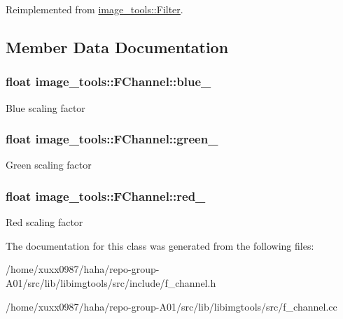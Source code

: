 Reimplemented from \hyperlink{classimage__tools_1_1Filter_afd5d1be5736e343077d331896d4130d9}{image\+\_\+tools\+::\+Filter}.



\subsection{Member Data Documentation}
\subsubsection[{\texorpdfstring{blue\+\_\+}{blue_}}]{\setlength{\rightskip}{0pt plus 5cm}float image\+\_\+tools\+::\+F\+Channel\+::blue\+\_\+\hspace{0.3cm}{\ttfamily [private]}}\hypertarget{classimage__tools_1_1FChannel_a3eb08bcf47005e1672b4516b0c75d7a9}{}\label{classimage__tools_1_1FChannel_a3eb08bcf47005e1672b4516b0c75d7a9}
Blue scaling factor 
\subsubsection[{\texorpdfstring{green\+\_\+}{green_}}]{\setlength{\rightskip}{0pt plus 5cm}float image\+\_\+tools\+::\+F\+Channel\+::green\+\_\+\hspace{0.3cm}{\ttfamily [private]}}\hypertarget{classimage__tools_1_1FChannel_a42ef11eef9bfad14df5007959047ccc6}{}\label{classimage__tools_1_1FChannel_a42ef11eef9bfad14df5007959047ccc6}
Green scaling factor 
\subsubsection[{\texorpdfstring{red\+\_\+}{red_}}]{\setlength{\rightskip}{0pt plus 5cm}float image\+\_\+tools\+::\+F\+Channel\+::red\+\_\+\hspace{0.3cm}{\ttfamily [private]}}\hypertarget{classimage__tools_1_1FChannel_a6d2b5a5e5bffb3673df6191cf642f337}{}\label{classimage__tools_1_1FChannel_a6d2b5a5e5bffb3673df6191cf642f337}
Red scaling factor 

The documentation for this class was generated from the following files\+:\begin{DoxyCompactItemize}
\item 
/home/xuxx0987/haha/repo-\/group-\/\+A01/src/lib/libimgtools/src/include/f\+\_\+channel.\+h\item 
/home/xuxx0987/haha/repo-\/group-\/\+A01/src/lib/libimgtools/src/f\+\_\+channel.\+cc\end{DoxyCompactItemize}
